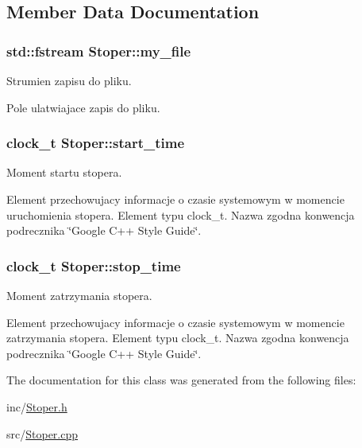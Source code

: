 \subsection{Member Data Documentation}
\hypertarget{class_stoper_af4b77a51397bf1dfd324987685bc4d5b}{
\subsubsection[{my\-\_\-file}]{\setlength{\rightskip}{0pt plus 5cm}std\-::fstream Stoper\-::my\-\_\-file\hspace{0.3cm}{\ttfamily [private]}}}\label{class_stoper_af4b77a51397bf1dfd324987685bc4d5b}


Strumien zapisu do pliku. 

Pole ulatwiajace zapis do pliku. \hypertarget{class_stoper_a333b53d442ef20aa9ab907baf2c8f3b5}{
\subsubsection[{start\-\_\-time}]{\setlength{\rightskip}{0pt plus 5cm}clock\-\_\-t Stoper\-::start\-\_\-time\hspace{0.3cm}{\ttfamily [private]}}}\label{class_stoper_a333b53d442ef20aa9ab907baf2c8f3b5}


Moment startu stopera. 

Element przechowujacy informacje o czasie systemowym w momencie uruchomienia stopera. Element typu clock\-\_\-t. Nazwa zgodna konwencja podrecznika \char`\"{}\-Google C++ Style Guide\char`\"{}. \hypertarget{class_stoper_a75fde898e50b0a40353881f51e7510d5}{
\subsubsection[{stop\-\_\-time}]{\setlength{\rightskip}{0pt plus 5cm}clock\-\_\-t Stoper\-::stop\-\_\-time\hspace{0.3cm}{\ttfamily [private]}}}\label{class_stoper_a75fde898e50b0a40353881f51e7510d5}


Moment zatrzymania stopera. 

Element przechowujacy informacje o czasie systemowym w momencie zatrzymania stopera. Element typu clock\-\_\-t. Nazwa zgodna konwencja podrecznika \char`\"{}\-Google C++ Style Guide\char`\"{}. 

The documentation for this class was generated from the following files\-:\begin{DoxyCompactItemize}
\item 
inc/\hyperlink{_stoper_8h}{Stoper.\-h}\item 
src/\hyperlink{_stoper_8cpp}{Stoper.\-cpp}\end{DoxyCompactItemize}
